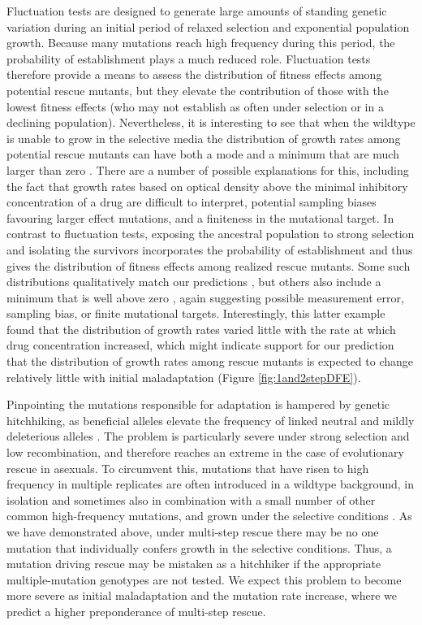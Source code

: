 \documentclass[9pt,twocolumn,twoside,lineno]{gsajnl}
\begin{document}
Fluctuation tests are designed to generate large amounts of standing genetic variation during an initial period of relaxed selection and exponential population growth.
Because many mutations reach high frequency during this period, the probability of establishment plays a much reduced role.
Fluctuation tests therefore provide a means to assess the distribution of fitness effects among potential rescue mutants, but they elevate the contribution of those with the lowest fitness effects (who may not establish as often under selection or in a declining population).
Nevertheless, it is interesting to see that when the wildtype is unable to grow in the selective media the distribution of growth rates among potential rescue mutants can have both a mode and a minimum that are much larger than zero \citep{Kassen2006,MacLean2009}.
There are a number of possible explanations for this, including the fact that growth rates based on optical density above the minimal inhibitory concentration of a drug are difficult to interpret, potential sampling biases favouring larger effect mutations, and a finiteness in the mutational target.
In contrast to fluctuation tests, exposing the ancestral population to strong selection and isolating the survivors incorporates the probability of establishment and thus gives the distribution of fitness effects among realized rescue mutants. 
Some such distributions qualitatively match our predictions \citep{Gerstein2012,Gerstein2015}, but others also include a minimum that is well above zero \citep{Lindsey2013}, again suggesting possible measurement error, sampling bias, or finite mutational targets.
Interestingly, this latter example found that the distribution of growth rates varied little with the rate at which drug concentration increased, which might indicate support for our prediction that the distribution of growth rates among rescue mutants is expected to change relatively little with initial maladaptation (Figure \ref{fig:1and2stepDFE}).

Pinpointing the mutations responsible for adaptation is hampered by genetic hitchhiking, as beneficial alleles elevate the frequency of linked neutral and mildly deleterious alleles \citep{barton2000genetic}.
The problem is particularly severe under strong selection and low recombination, and therefore reaches an extreme in the case of evolutionary rescue in asexuals.
To circumvent this, mutations that have risen to high frequency in multiple replicates are often introduced in a wildtype background, in isolation and sometimes also in combination with a small number of other common high-frequency mutations, and grown under the selective conditions \citep[e.g.,][]{jochumsen2016evolution,ono2017widespread}.
As we have demonstrated above, under multi-step rescue there may be no one mutation that individually confers growth in the selective conditions.
Thus, a mutation driving rescue may be mistaken as a hitchhiker if the appropriate multiple-mutation genotypes are not tested. 
We expect this problem to become more severe as initial maladaptation and the mutation rate increase, where we predict a higher preponderance of multi-step rescue.
\end{document}
